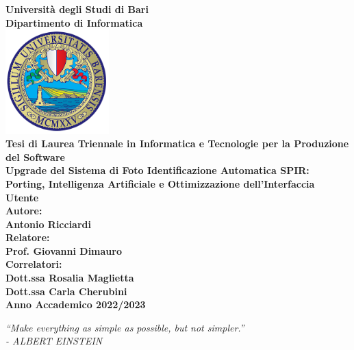\documentclass[a4paper,12pt]{report}
\begin{document}

\begin{titlepage}
\centering

\textbf{\large Università degli Studi di Bari} \\
\vspace{0.3cm}
\textbf{\large Dipartimento di Informatica} \\
\vspace{1.5cm}
\includegraphics[width=40mm,scale=0.5]{assets/images/logo.png} \\
\vspace{1.5cm}
\textbf{\large Tesi di Laurea Triennale in Informatica e Tecnologie per la Produzione del Software} \\
\vspace{1cm}
\textbf{\LARGE Upgrade del Sistema di Foto Identificazione Automatica SPIR: Porting, Intelligenza Artificiale e Ottimizzazione dell'Interfaccia Utente} \\
\vspace{0.7cm}
\textbf{\large Autore:} \\
\textbf{Antonio Ricciardi} \\
\vspace{0.3cm}
\textbf{\large Relatore:} \\
\textbf{Prof. Giovanni Dimauro} \\
\vspace{0.3cm}
\textbf{\large Correlatori:} \\
\textbf{Dott.ssa Rosalia Maglietta} \\
\textbf{Dott.ssa Carla Cherubini} \\
\vfill
\vspace{0.3cm}
\textbf{\large Anno Accademico 2022/2023} %
    
\end{titlepage}
\clearpage
\thispagestyle{empty}

\vspace*{\fill}
\begin{center}
\textit{“Make everything as simple as possible, but not simpler.”\\
- ALBERT EINSTEIN}
\end{center}
\vfill
\clearpage
\tableofcontents
\end{document}
